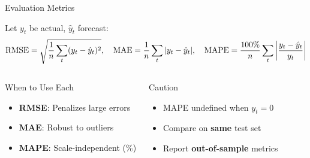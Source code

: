 \documentclass[9pt, aspectratio=169, t]{beamer}
\begin{document}
\begin{frame}{Evaluation Metrics}
    \begin{defn}
        Let $y_t$ be actual, $\hat{y}_t$ forecast:
        \vspace{-0.2cm}
        \begin{align*}
            \text{RMSE} = \sqrt{\frac{1}{n}\sum_{t}(y_t - \hat{y}_t)^2}, \quad
            \text{MAE} = \frac{1}{n}\sum_{t}|y_t - \hat{y}_t|, \quad
            \text{MAPE} = \frac{100\%}{n}\sum_{t}\left|\frac{y_t - \hat{y}_t}{y_t}\right|
        \end{align*}
    \end{defn}

    \begin{columns}[T]
        \begin{exampleblock}{When to Use Each}
            \begin{itemize}\setlength{\itemsep}{0pt}
                \item \textbf{RMSE}: Penalizes large errors
                \item \textbf{MAE}: Robust to outliers
                \item \textbf{MAPE}: Scale-independent (\%)
            \end{itemize}
        \end{exampleblock}

        \begin{alertblock}{Caution}
            \begin{itemize}\setlength{\itemsep}{0pt}
                \item MAPE undefined when $y_t = 0$
                \item Compare on \textbf{same} test set
                \item Report \textbf{out-of-sample} metrics
            \end{itemize}
        \end{alertblock}
    \end{columns}
\end{frame}
\end{document}
